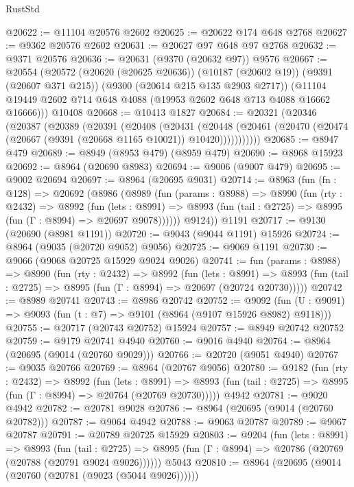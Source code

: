 \begin{lexlean}{RustStd}
\begin{coremodule}
@20622 := @11104 @20576 @2602
@20625 := @20622 @174 @648 @2768
@20627 := @9362 @20576 @2602
@20631 := @20627 @97 @648 @97 @2768
@20632 := @9371 @20576
@20636 := @20631 (@9370 (@20632 @97)) @9576
@20667 := @20554
    (@20572
      (@20620 (@20625 @20636))
      (@10187 (@20602 @19))
      (@9391 (@20607 @371 @215))
      (@9300 (@20614 @215 @135 @2903 @2717))
      (@11104 @19449 @2602 @714 @648 @4088 (@19953 @2602 @648 @713 @4088 @16662 @16666)))
    @10408
@20668 := @10413 @1827
@20684 := @20321
    (@20346
      (@20387
        (@20389
          (@20391
            (@20408
              (@20431
                (@20448
                  (@20461 (@20470 (@20474 (@20667 (@9391 (@20668 @1165 @10021)) @10420)))))))))))
@20685 := @8947 @479
@20689 := @8949 (@8953 @479) (@8959 @479)
@20690 := @8968 @15923
@20692 := @8964 (@20690 @8983)
@20694 := @9006 (@9007 @479)
@20695 := @9002 @20694
@20697 := @8964 (@20695 @9031)
@20714 := @8963
    (fun (fn : @128) =>
    @20692
      (@8986
        (@8989
          (fun (params : @8988) =>
          @8990
            (fun (rty : @2432) =>
            @8992
              (fun (lets : @8991) =>
              @8993 (fun (tail : @2725) => @8995 (fun (Γ : @8994) => @20697 @9078))))))
        @9124))
    @1191
@20717 := @9130 (@20690 (@8981 @1191))
@20720 := @9043 (@9044 @1191) @15926
@20724 := @8964 (@9035 (@20720 @9052) @9056)
@20725 := @9069 @1191
@20730 := @9066 (@9068 @20725 @15929 @9024 @9026)
@20741 := fun (params : @8988) =>
  @8990
    (fun (rty : @2432) =>
    @8992
      (fun (lets : @8991) =>
      @8993 (fun (tail : @2725) => @8995 (fun (Γ : @8994) => @20697 (@20724 @20730)))))
@20742 := @8989 @20741
@20743 := @8986 @20742
@20752 := @9092
    (fun (U : @9091) => @9093 (fun (t : @7) => @9101 (@8964 (@9107 @15926 @8982) @9118)))
@20755 := @20717 (@20743 @20752) @15924
@20757 := @8949 @20742 @20752
@20759 := @9179 @20741 @4940
@20760 := @9016 @4940
@20764 := @8964 (@20695 (@9014 (@20760 @9029)))
@20766 := @20720 (@9051 @4940)
@20767 := @9035 @20766
@20769 := @8964 (@20767 @9056)
@20780 := @9182
    (fun (rty : @2432) =>
    @8992
      (fun (lets : @8991) =>
      @8993 (fun (tail : @2725) => @8995 (fun (Γ : @8994) => @20764 (@20769 @20730)))))
    @4942
@20781 := @9020 @4942
@20782 := @20781 @9028
@20786 := @8964 (@20695 (@9014 (@20760 @20782)))
@20787 := @9064 @4942
@20788 := @9063 @20787
@20789 := @9067 @20787
@20791 := @20789 @20725 @15929
@20803 := @9204
    (fun (lets : @8991) =>
    @8993
      (fun (tail : @2725) =>
      @8995 (fun (Γ : @8994) => @20786 (@20769 (@20788 (@20791 @9024 @9026))))))
    @5043
@20810 := @8964 (@20695 (@9014 (@20760 (@20781 (@9023 (@5044 @9026))))))

\end{coremodule}
\end{lexlean}
